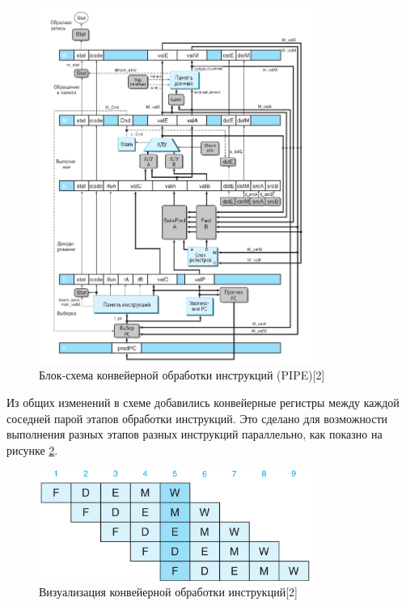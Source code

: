 \documentclass[12pt,a4paper]{article}
\begin{document}
\begin{figure}[ht!]
\centering
\includegraphics[width=0.8\textwidth]{pipe.png}
\caption{Блок-схема конвейерной обработки инструкций (PIPE)[2]}
\label{fig:pipe}
\end{figure}

Из общих изменений в схеме добавились конвейерные регистры между каждой соседней парой этапов обработки инструкций. Это сделано для возможности выполнения разных этапов разных инструкций параллельно, как показно на рисунке \ref{fig:pipeline}.

\begin{figure}[ht!]
    \centering
    \includegraphics[width=0.8\textwidth]{pipeline.png}
    \caption{Визуализация конвейерной обработки инструкций[2]}
    \label{fig:pipeline}
\end{figure}
\end{document}
